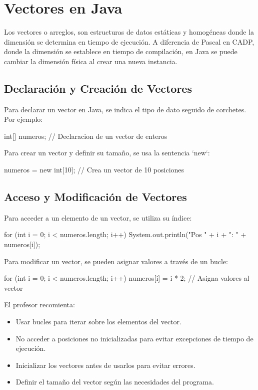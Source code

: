 \documentclass[a4paper]{report}
\begin{document}
\section{Vectores en Java}

Los vectores o arreglos, son estructuras de datos estáticas y homogéneas donde la dimensión se determina en tiempo de ejecución. A diferencia de Pascal en CADP, donde la dimensión se establece en tiempo de compilación, en Java se puede cambiar la dimensión física al crear una nueva instancia.

\subsection{Declaración y Creación de Vectores}

Para declarar un vector en Java, se indica el tipo de dato seguido de corchetes. Por ejemplo:

\begin{roundedlst}
int[] numeros;  // Declaracion de un vector de enteros
\end{roundedlst}

Para crear un vector y definir su tamaño, se usa la sentencia `new`:

\begin{roundedlst}
numeros = new int[10];  // Crea un vector de 10 posiciones
\end{roundedlst}

\subsection{Acceso y Modificación de Vectores}
Para acceder a un elemento de un vector, se utiliza su índice:

\begin{roundedlst}
for (int i = 0; i < numeros.length; i++) {
    System.out.println("Pos " + i + ": " + numeros[i]);
}
\end{roundedlst}

Para modificar un vector, se pueden asignar valores a través de un bucle:

\begin{roundedlst}
for (int i = 0; i < numeros.length; i++) {
    numeros[i] = i * 2;  // Asigna valores al vector
}
\end{roundedlst}

El profesor recomienta:
\begin{itemize}
    \item Usar bucles para iterar sobre los elementos del vector.

    \item No acceder a posiciones no inicializadas para evitar excepciones de tiempo de ejecución.

    \item Inicializar los vectores antes de usarlos para evitar errores.

    \item Definir el tamaño del vector según las necesidades del programa.
\end{itemize}
\end{document}
